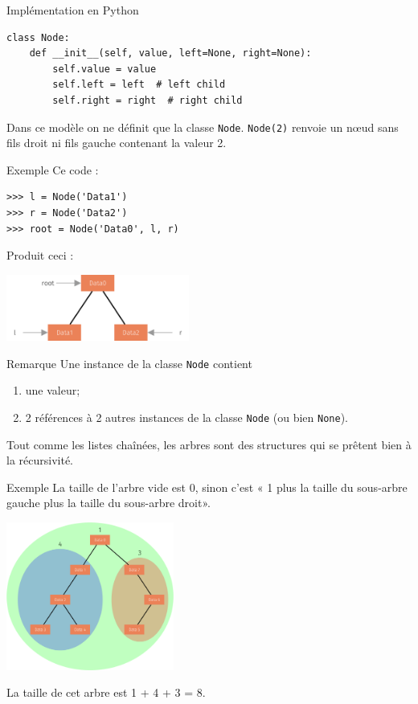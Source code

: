 \documentclass[10pt]{nsibeamer}
\begin{document}
\begin{frame}[fragile]{Implémentation en Python}
\begin{verbatim}
class Node:
    def __init__(self, value, left=None, right=None):
        self.value = value
        self.left = left  # left child
        self.right = right  # right child
\end{verbatim}


\pause
Dans ce modèle on ne définit que la classe \texttt{Node}. \texttt{Node(2)} renvoie un n\oe ud sans fils droit ni fils gauche contenant la valeur 2.
\end{frame}
\begin{frame}[fragile]{Exemple}
Ce code :
\begin{verbatim}
>>> l = Node('Data1')
>>> r = Node('Data2')
>>> root = Node('Data0', l, r)
\end{verbatim}
\pause
Produit ceci : 
    \begin{center}
    \includegraphics[width=6cm]{img/arbre_bin_4}
\end{center}
\end{frame}
\begin{frame}{Remarque}
Une instance de la classe \texttt{Node} contient 
\begin{enumerate}[--]
	\item une valeur;
    \item 2 références à 2 autres instances de la classe \texttt{Node} (ou bien \texttt{None}).
\end{enumerate}  \pause
Tout comme les listes chaînées, les arbres sont des structures qui se prêtent bien à la récursivité.
\end{frame}
\begin{frame}{Exemple}
    La taille de l'arbre vide est 0, sinon c'est « 1 plus la taille du sous-arbre gauche plus la taille du sous-arbre droit».\pause
    \begin{center}
        \includegraphics[width=5.5cm]{img/taille}
    \end{center}
La taille de cet arbre est 1 + 4 + 3 = 8.
\end{frame}
\end{document}
